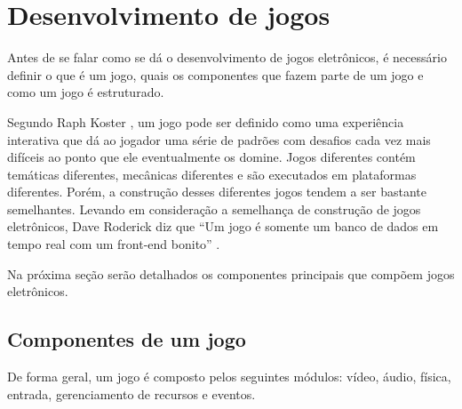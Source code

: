 \section{Desenvolvimento de jogos}

Antes de se falar como se dá o desenvolvimento de jogos eletrônicos, é necessário definir o que é um jogo, quais os componentes que fazem parte de um jogo e como um jogo é estruturado.

Segundo Raph Koster \cite{koster2014a}, um jogo pode ser definido como uma experiência interativa que dá ao jogador uma série de padrões com desafios cada vez mais difíceis ao ponto que ele eventualmente os domine. Jogos diferentes contém temáticas diferentes, mecânicas diferentes e são executados em plataformas diferentes. Porém, a construção desses diferentes jogos tendem a ser bastante semelhantes. Levando em consideração a semelhança de construção de jogos eletrônicos, Dave Roderick diz que “Um jogo é somente um banco de dados em tempo real com um front-end bonito” \cite[p.~625]{rollings2004game}.

Na próxima seção serão detalhados os componentes principais que compõem jogos eletrônicos.

\subsection{Componentes de um jogo}

De forma geral, um jogo é composto pelos seguintes módulos: vídeo, áudio, física, entrada, gerenciamento de recursos e eventos.

